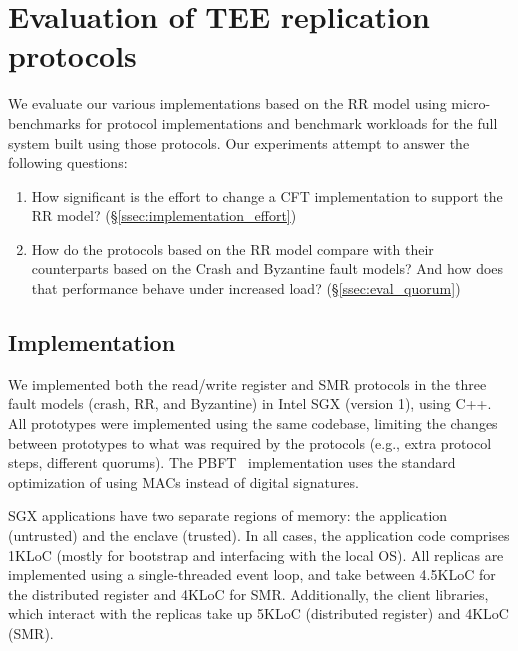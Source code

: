 \section{Evaluation of \ac{TEE} replication protocols}

We evaluate our various implementations based on the \ac{RR}
model using micro-benchmarks for protocol implementations and
benchmark workloads for the full system built using those
protocols. Our experiments attempt to answer the following
questions:

\begin{enumerate}
    \item How significant is the effort to change a \ac{CFT}
        implementation to support the \ac{RR} model?
        (\S\ref{ssec:implementation_effort})
    \item How do the protocols based on the \ac{RR} model
      compare with their counterparts based on the Crash and Byzantine
      fault models? And how does that performance behave under increased load?  (\S\ref{ssec:eval_quorum})
\end{enumerate}

\subsection{Implementation}\label{ssec:impl}

We implemented both the read/write register and SMR protocols in
the three fault models (crash, \ac{RR}, and Byzantine) in Intel
SGX (version 1), using C++. All prototypes were implemented using
the same codebase, limiting the changes between prototypes to
what was required by the protocols (e.g., extra protocol steps,
different quorums). The PBFT~\cite{pbft} implementation uses the
standard optimization of using MACs instead of digital
signatures.

SGX applications have two separate regions of memory: the
application (untrusted) and the enclave (trusted). In all cases,
the application code comprises 1KLoC (mostly for bootstrap and
interfacing with the local \ac{OS}). All replicas are implemented
using a single-threaded event loop, and take between 4.5KLoC for
the distributed register and 4KLoC for \ac{SMR}. Additionally, the client libraries, which
interact with the replicas take up 5KLoC (distributed
register) and 4KLoC (\ac{SMR}).


